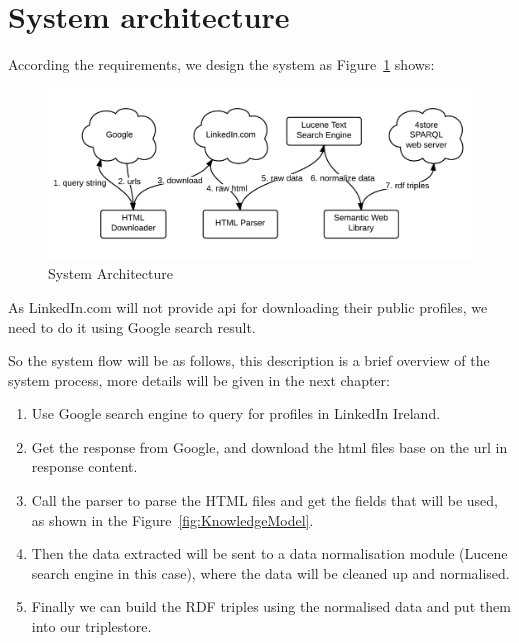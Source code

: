 \section{System architecture}

According the requirements, we design the system as Figure~\ref{fig:SystemArchitecture} shows:

\begin{figure}[H]
	\centering
	\includegraphics[width=1.0\textwidth]{images/system-architecture.png}
	\caption{System Architecture\protect}
	\label{fig:SystemArchitecture}
\end{figure}


As LinkedIn.com will not provide \gls{api} for downloading their public profiles, we need to do it using Google search result.

So the system flow will be as follows, this description is a brief overview of the system process, more details will be given in the next chapter:
\begin{enumerate}
	\item Use Google search engine to query for profiles in LinkedIn Ireland.
	\item Get the response from Google, and download the html files base on the \gls{url} in response content.
	\item Call the parser to parse the HTML files and get the fields that will be used, as shown in the Figure~\ref{fig:KnowledgeModel}.
	\item Then the data extracted will be sent to a data normalisation module (Lucene search engine in this case), where the data will be cleaned up and normalised.
	\item Finally we can build the RDF triples using the normalised data and put them into our triplestore.
\end{enumerate}

